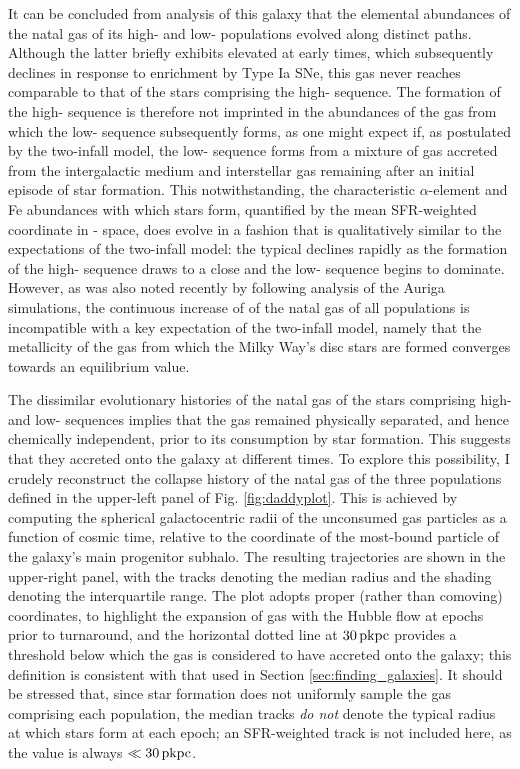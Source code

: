 It can be concluded from analysis of this galaxy that the elemental abundances of the natal gas of its high- and low-\afe{} populations evolved along distinct paths. Although the latter briefly exhibits elevated \afe{} at early times, which subsequently declines in response to enrichment by Type Ia SNe, this gas never reaches \afe{} comparable to that of the stars comprising the high-\afe{} sequence. The formation of the high-\afe{} sequence is therefore not imprinted in the abundances of the gas from which the low-\afe{} sequence subsequently forms, as one might expect if, as postulated by the two-infall model, the low-\afe{} sequence forms from a mixture of gas accreted from the intergalactic medium and interstellar gas remaining after an initial episode of star formation. This notwithstanding, the characteristic $\alpha$-element and Fe abundances with which stars form, quantified by the mean SFR-weighted coordinate in \afe{}-\feh{} space, does evolve in a fashion that is qualitatively similar to the expectations of the two-infall model: the typical \afe{} declines rapidly as the formation of the high-\afe{} sequence draws to a close and the low-\afe{} sequence begins to dominate. However, as was also noted recently by \citet{2017arXiv170807834G} following analysis of the Auriga simulations, the continuous increase of \feh{} of the natal gas of all populations is incompatible with a key expectation of the two-infall model, namely that the metallicity of the gas from which the Milky Way's disc stars are formed converges towards an equilibrium value.

The dissimilar evolutionary histories of the natal gas of the stars comprising high- and low-\afe{} sequences implies that the gas remained physically separated, and hence chemically independent, prior to its consumption by star formation. This suggests that they accreted onto the galaxy at different times. To explore this possibility, I crudely reconstruct the collapse history of the natal gas of the three populations defined in the upper-left panel of Fig. \ref{fig:daddyplot}. This is achieved by computing the spherical galactocentric radii of the unconsumed gas particles as a function of cosmic time, relative to the coordinate of the most-bound particle of the galaxy's main progenitor subhalo. The resulting trajectories are shown in the upper-right panel, with the tracks denoting the median radius and the shading denoting the interquartile range. The plot adopts proper (rather than comoving) coordinates, to highlight the expansion of gas with the Hubble flow at epochs prior to turnaround, and the horizontal dotted line at $30\,{\rm pkpc}$ provides a threshold below which the gas is considered to have accreted onto the galaxy; this definition is consistent with that used in Section \ref{sec:finding_galaxies}. It should be stressed that, since star formation does not uniformly sample the gas comprising each population, the median tracks \emph{do not} denote the typical radius at which stars form at each epoch;  an SFR-weighted track is not included here, as the value is always $\ll 30\,{\rm pkpc}$. 

